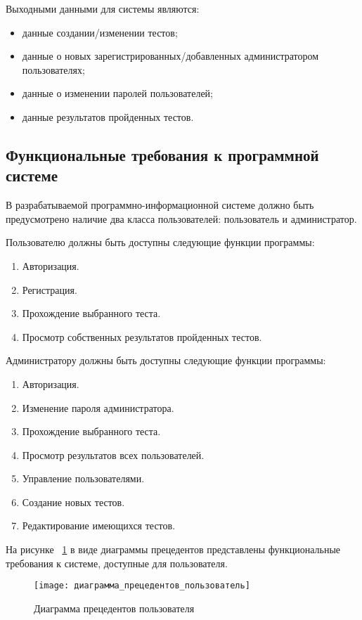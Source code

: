 Выходными данными для системы являются:
\begin{itemize}
	\item данные создании/изменении тестов;
	\item данные о новых зарегистрированных/добавленных администратором пользователях;
	\item данные о изменении паролей пользователей;
	\item данные результатов пройденных тестов.
\end{itemize}

\subsection{Функциональные требования к программной системе}

В разрабатываемой программно-информационной системе должно
быть предусмотрено наличие два класса пользователей: пользователь и администратор.

Пользователю должны быть доступны следующие функции программы:
\begin{enumerate}
	\item Авторизация.
	\item Регистрация.
	\item Прохождение выбранного теста.
	\item Просмотр собственных результатов пройденных тестов.
\end{enumerate}

Администратору должны быть доступны следующие функции программы:
\begin{enumerate}
	\item Авторизация.
	\item Изменение пароля администратора.
	\item Прохождение выбранного теста.
	\item Просмотр результатов всех пользователей.
	\item Управление пользователями.
	\item Создание новых тестов.
	\item Редактирование имеющихся тестов.
\end{enumerate}

\clearpage

На рисунке ~\ref{user_precedent_diagram:image} в виде диаграммы прецедентов представлены функциональные требования к системе, доступные для пользователя.

\begin{figure}[H]
	\texttt{[image: диаграмма\_прецедентов\_пользователь]}
	\caption{Диаграмма прецедентов пользователя}
	\label{user_precedent_diagram:image}
\end{figure}

